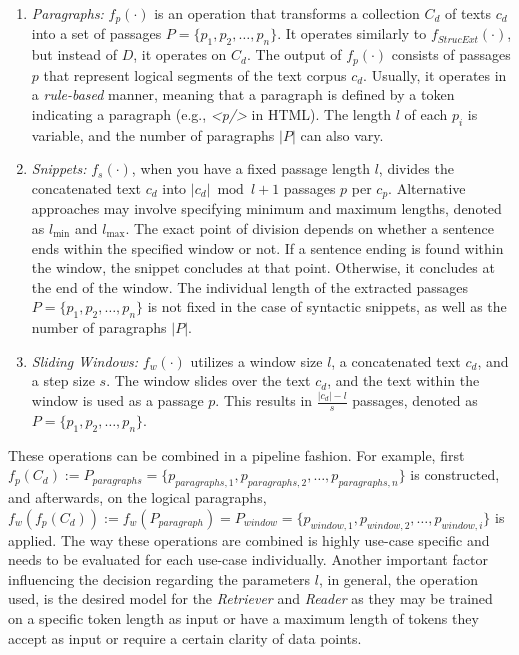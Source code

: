 \begin{enumerate}
    \item \textit{Paragraphs:} $f_p(\cdot)$ is an operation that transforms a collection $C_d$ of texts $c_d$ into a set of passages $P = \{p_1, p_2, \dots, p_n\}$. It operates similarly to $f_{StrucExt}(\cdot)$, but instead of $D$, it operates on $C_d$. The output of $f_p(\cdot)$ consists of passages $p$ that represent logical segments of the text corpus $c_d$. Usually, it operates in a \textit{rule-based} manner, meaning that a paragraph is defined by a token indicating a paragraph (e.g., \textit{<p/>} in HTML). The length $l$ of each $p_i$ is variable, and the number of paragraphs $|P|$ can also vary.
    \item \textit{Snippets:} $f_s(\cdot)$, when you have a fixed passage length $l$, divides the concatenated text $c_d$ into $|c_d|\bmod{l} + 1$ passages $p$ per $c_p$. Alternative approaches may involve specifying minimum and maximum lengths, denoted as $l_{\text{min}}$ and $l_{\text{max}}$. The exact point of division depends on whether a sentence ends within the specified window or not. If a sentence ending is found within the window, the snippet concludes at that point. Otherwise, it concludes at the end of the window. The individual length of the extracted passages $P = \{p_1, p_2, \ldots, p_n\}$ is not fixed in the case of syntactic snippets, as well as the number of paragraphs $|P|$.
    \item \textit{Sliding Windows:} $f_w(\cdot)$ utilizes a window size $l$, a concatenated text $c_d$, and a step size $s$. The window slides over the text $c_d$, and the text within the window is used as a passage $p$. This results in $\frac{|c_d| - l}{s}$ passages, denoted as $P = \{p_1, p_2, \ldots, p_n\}$.
\end{enumerate}

These operations can be combined in a pipeline fashion. For example, first $f_p(C_d) := P_{paragraphs} = \{p_{paragraphs,1}, p_{paragraphs,2}, \dots, p_{paragraphs,n}\}$ is constructed, and afterwards, on the logical paragraphs, $f_w(f_p(C_d)) := f_w(P_{paragraph}) = P_{window} = \{p_{window,1}, \allowbreak p_{window,2}, \allowbreak \dots, p_{window,i}\}$ is applied. The way these operations are combined is highly use-case specific and needs to be evaluated for each use-case individually. Another important factor influencing the decision regarding the parameters $l$, in general, the operation used, is the desired model for the \textit{Retriever} and \textit{Reader} as they may be trained on a specific token length as input or have a maximum length of tokens they accept as input or require a certain clarity of data points.



